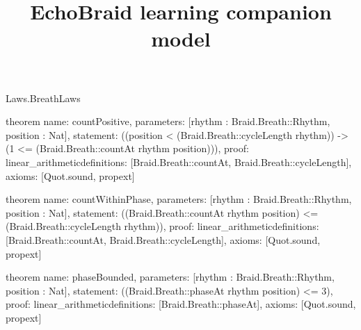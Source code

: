 \begin{lexlean}{Laws.BreathLaws}
\title{EchoBraid learning companion model}
\begin{semanticmodule}
theorem{
  name: countPositive,
  parameters: [rhythm : Braid.Breath::Rhythm, position : Nat],
  statement: ((position < (Braid.Breath::cycleLength rhythm)) -> (1 <= (Braid.Breath::countAt rhythm position))),
  proof: linear_arithmetic{definitions: [Braid.Breath::countAt, Braid.Breath::cycleLength]},
  axioms: [Quot.sound, propext]
}

theorem{
  name: countWithinPhase,
  parameters: [rhythm : Braid.Breath::Rhythm, position : Nat],
  statement: ((Braid.Breath::countAt rhythm position) <= (Braid.Breath::cycleLength rhythm)),
  proof: linear_arithmetic{definitions: [Braid.Breath::countAt, Braid.Breath::cycleLength]},
  axioms: [Quot.sound, propext]
}

theorem{
  name: phaseBounded,
  parameters: [rhythm : Braid.Breath::Rhythm, position : Nat],
  statement: ((Braid.Breath::phaseAt rhythm position) <= 3),
  proof: linear_arithmetic{definitions: [Braid.Breath::phaseAt]},
  axioms: [Quot.sound, propext]
}
\end{semanticmodule}
\end{lexlean}
